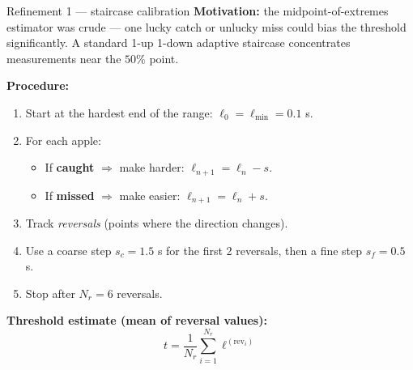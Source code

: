 \documentclass[10pt,aspectratio=169]{beamer}
\begin{document}
\begin{frame}{Refinement 1 --- staircase calibration}
\textbf{Motivation:} the midpoint-of-extremes estimator was crude --- one lucky catch or unlucky miss could bias the threshold significantly. A standard 1-up 1-down adaptive staircase concentrates measurements near the $50\%$ point.

\textbf{Procedure:}
\begin{enumerate}
    \item Start at the hardest end of the range: $\ell_0 = \ell_{\min} = 0.1$ s.
    \item For each apple:
    \begin{itemize}
        \item If \textbf{caught} $\Rightarrow$ make harder: $\ell_{n+1} = \ell_n - s$.
        \item If \textbf{missed} $\Rightarrow$ make easier: $\ell_{n+1} = \ell_n + s$.
    \end{itemize}
    \item Track \emph{reversals} (points where the direction changes).
    \item Use a coarse step $s_c = 1.5$ s for the first 2 reversals, then a fine step $s_f = 0.5$ s.
    \item Stop after $N_r = 6$ reversals.
\end{enumerate}

\textbf{Threshold estimate (mean of reversal values):}
\[
t = \frac{1}{N_r} \sum_{i=1}^{N_r} \ell^{(\text{rev}_i)}
\]
\end{frame}

\end{document}
